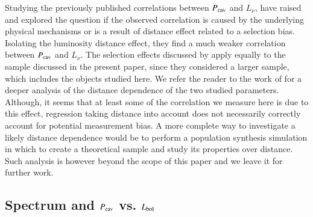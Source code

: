 \documentclass{aa}  %
\begin{document}
Studying the previously published correlations between $P_{\rm{cav}}$ and $L_{\nu}$, \cite{Leith2016} have raised and explored the question if the observed correlation is caused by the underlying physical mechanisms or is a result of distance effect related to a selection bias. Isolating the luminosity distance effect, they find a much weaker correlation between $P_{\rm{cav}}$ and $L_{\nu}$.
The selection effects discussed by \cite{Leith2016} apply equally to the sample discussed in the present paper, since
they considered a larger sample, which includes the objects studied here.
We refer the reader to the work of  \cite{Leith2016} for a deeper analysis of the distance dependence of the two studied parameters.
Although, it seems that at least some of the correlation we measure here is due to this effect, regression taking distance into account does not necessarily correctly account for potential measurement bias.
A more complete way to investigate a likely distance dependence would be to perform a population synthesis simulation in which to create a theoretical sample and study its properties over distance.
Such analysis is however beyond the scope of this paper and we leave it for further work.






\subsection{Spectrum and $P_{\rm{cav}}$ vs. $L_{\rm{bol}}$}
\label{lab:Spectrum}
\end{document}
